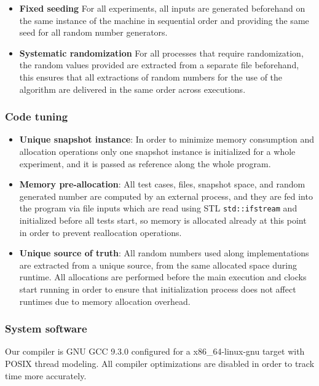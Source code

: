 \begin{itemize}
    \item{\textbf{Fixed seeding}
    For all experiments, all inputs are generated beforehand on the same instance of the machine in sequential order and providing the same seed for all random number generators.}
    
    \item{\textbf{Systematic randomization}
    For all processes that require randomization, the random values provided are extracted from a separate file beforehand, this ensures that all extractions of random numbers for the use of the algorithm are delivered in the same order across executions.}
\end{itemize}

\subsubsection{Code tuning}
\begin{itemize}
    \item{\textbf{Unique snapshot instance}: 
    In order to minimize memory consumption and allocation operations only one snapshot instance is initialized for a whole experiment, and it is passed as reference along the whole program.}
    \item{\textbf{Memory pre-allocation}: 
    All test cases, files, snapshot space, and random generated number are computed by an external process, and they are fed into the program via file inputs which are read using STL \texttt{std::ifstream} and initialized before all tests start, so memory is allocated already at this point in order to prevent reallocation operations.}
    \item{\textbf{Unique source of truth}:
    All random numbers used along implementations are extracted from a unique source, from the same allocated space during runtime. All allocations are performed before the main execution and clocks start running in order to ensure that initialization process does not affect runtimes due to memory allocation overhead.}
\end{itemize}

\subsubsection{System software}
Our compiler is GNU GCC 9.3.0 configured for a x86\_64-linux-gnu target with POSIX thread modeling. All compiler optimizations are disabled in order to track time more accurately.
